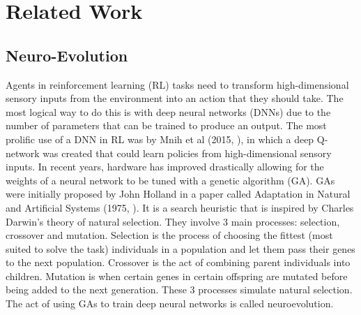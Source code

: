 \chapter{Related Work}

\label{ch:background}

\section{Neuro-Evolution}
Agents in reinforcement learning (RL) tasks need to transform high-dimensional sensory inputs from the environment into an action that they should take. The most logical way to do this is with deep neural networks (DNNs) due to the number of parameters that can be trained to produce an output. The most prolific use of a DNN in RL was by Mnih et al (2015, \cite{mnih}), in which a deep Q-network was created that could learn policies from high-dimensional sensory inputs. In recent years, hardware has improved drastically allowing for the weights of a neural network to be tuned with a genetic algorithm (GA). GAs were initially proposed by John Holland in a paper called Adaptation in Natural and Artificial Systems (1975, \cite{holland}). It is a search heuristic that is inspired by Charles Darwin's theory of natural selection. They involve 3 main processes: selection, crossover and mutation. Selection is the process of choosing the fittest (most suited to solve the task) individuals in a population and let them pass their genes to the next population. Crossover is the act of combining parent individuals into children. Mutation is when certain genes in certain offspring are mutated before being added to the next generation. These 3 processes simulate natural selection. The act of using GAs to train deep neural networks is called neuroevolution.

\paragraph{}

